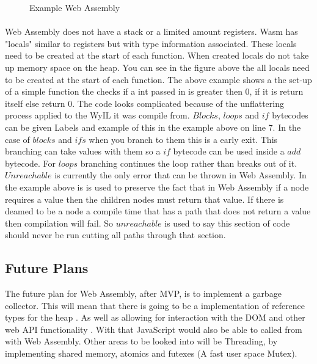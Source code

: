 \begin{figure}[H]
  \centering
  
  \caption{Example Web Assembly}
  \label{fig:wasm}
\end{figure}

\paragraph{}

Web Assembly does not have a stack or a limited amount registers. Wasm has "locals" similar to registers but with type information associated. These locals need to be created at the start of each function. When created locals do not take up memory space on the heap. You can see in the figure above the all locals need to be created at the start of each function. 
The above example shows a the set-up of a simple function the checks if a int passed in is greater then 0, if it is return itself else return 0. The code looks complicated because of the unflattering process applied to the WyIL it was compile from. $Blocks$, $loops$ and $if$ bytecodes can be given Labels and example of this in the example above on line 7. In the case of $blocks$ and $ifs$ when you branch to them this is a early exit. This branching can take values with them so a $if$ bytecode can be used inside a $add$ bytecode. For $loops$ branching continues the loop rather than breaks out of it. $Unreachable$ is currently the only error that can be thrown in Web Assembly. In the example above is is used to preserve the fact that in Web Assembly if a node requires a value then the children nodes must return that value. If there is deamed to be a node a compile time that has a path that does not return a value then compilation will fail. So $unreachable$ is used to say this section of code should never be run cutting all paths through that section.

\subsection{Future Plans}\label{subsec:wafp}

The future plan for Web Assembly, after MVP, is to implement a garbage collector. This will mean that there is going to be a implementation of reference types for the heap \cite{5_gohman_wagner_bastien_2016}. As well as allowing for interaction with the DOM and other web API functionality \cite{5_gohman_wagner_bastien_2016}. With that JavaScript would also be able to called from with Web Assembly. Other areas to be looked into will be Threading, by implementing shared memory, atomics and futexes (A fast user space Mutex)\cite{12_bastien_wagner_gohman_2016}.

